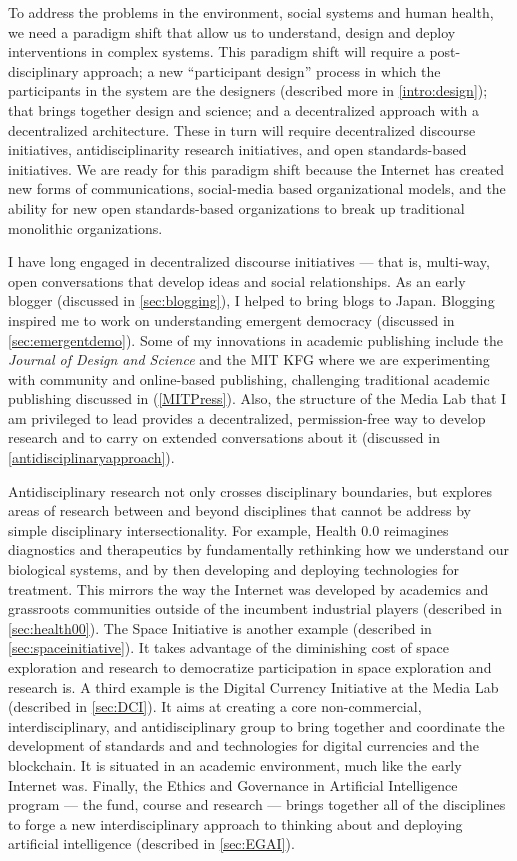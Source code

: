 To address the problems in the environment, social systems and human health, we need a paradigm shift that allow us to understand, design and deploy interventions in complex systems. This paradigm shift will require a post-disciplinary approach; a new ``participant design'' process in which the participants in the system are the designers \cite{slavin_design_2016} (described more in \autoref{intro:design}); that brings together design and science; and a decentralized approach with a decentralized architecture. These in turn will require decentralized discourse initiatives, antidisciplinarity research initiatives, and open standards-based initiatives. We are ready for this paradigm shift because the Internet has created new forms of communications, social-media based organizational models, and the ability for new open standards-based organizations to break up traditional monolithic organizations.

I have long engaged in decentralized discourse initiatives --- that is, multi-way, open conversations that develop ideas and social relationships. As an early blogger (discussed in \autoref{sec:blogging}), I helped to bring blogs to Japan. Blogging inspired me to work on understanding emergent democracy (discussed in \autoref{sec:emergentdemo}). Some of my innovations in academic publishing include the \emph{Journal of Design and Science} and the MIT \ac{KFG} where we are experimenting with community and online-based publishing, challenging traditional academic publishing discussed in (\autoref{MITPress}). Also, the structure of the Media Lab that I am privileged to lead provides a decentralized, permission-free way to develop research and to carry on extended conversations about it (discussed in \autoref{antidisciplinaryapproach}).

Antidisciplinary research not only crosses disciplinary boundaries, but explores areas of research between and beyond disciplines that cannot be address by simple disciplinary intersectionality. For example, Health 0.0 reimagines diagnostics and therapeutics by fundamentally rethinking how we understand our biological systems, and by then developing and deploying technologies for treatment. This mirrors the way the Internet was developed by academics and grassroots communities outside of the incumbent industrial players (described in \autoref{sec:health00}). The Space Initiative is another example (described in \autoref{sec:spaceinitiative}). It takes advantage of the diminishing cost of space exploration and research to democratize participation in space exploration and research is. A third example is the Digital Currency Initiative at the Media Lab (described in \autoref{sec:DCI}). It aims at creating a core non-commercial, interdisciplinary, and antidisciplinary group to bring together and coordinate the development of standards and and technologies for digital currencies and the blockchain. It is situated in an academic environment, much like the early Internet was. Finally, the Ethics and Governance in Artificial Intelligence program --- the fund, course and research --- brings together all of the disciplines to forge a new interdisciplinary approach to thinking about and deploying artificial intelligence (described in \autoref{sec:EGAI}).

